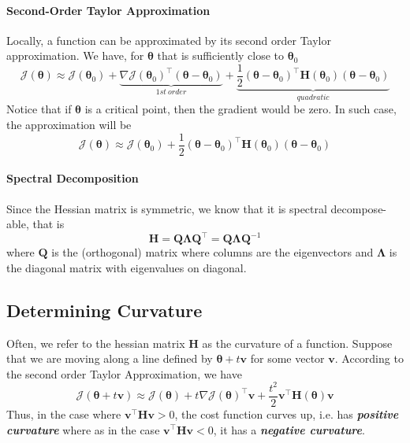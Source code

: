 \documentclass[11pt]{article}
\newcommand{\bv}{\mathbf{v}}
\begin{document}
\paragraph{Second-Order Taylor Approximation} Locally, a function can be approximated by its second order Taylor approximation. We have, for $\boldsymbol{\theta}$ that is sufficiently close to $\boldsymbol{\theta}_0$
\begin{equation}
    \mathcal{J}(\boldsymbol{\theta}) \approx \mathcal{J}\left(\boldsymbol{\theta}_{0}\right)+ 
    \underbrace{\nabla \mathcal{J}\left(\boldsymbol{\theta}_{0}\right)^{\top}\left(\boldsymbol{\theta}-\boldsymbol{\theta}_{0}\right)}_{1st~order}
     +\underbrace{\frac{1}{2}\left(\boldsymbol{\theta}-\boldsymbol{\theta}_{0}\right)^{\top} \mathbf{H}\left(\boldsymbol{\theta}_{0}\right)\left(\boldsymbol{\theta}-\boldsymbol{\theta}_{0}\right)}_{quadratic}
\end{equation}
Notice that if $\boldsymbol{\theta}$ is a critical point, then the gradient would be zero. In such case, the approximation will be
\begin{equation}
    \mathcal{J}(\boldsymbol{\theta}) \approx \mathcal{J}\left(\boldsymbol{\theta}_{0}\right)+\frac{1}{2}\left(\boldsymbol{\theta}-\boldsymbol{\theta}_{0}\right)^{\top} \mathbf{H}\left(\boldsymbol{\theta}_{0}\right)\left(\boldsymbol{\theta}-\boldsymbol{\theta}_{0}\right)
\end{equation}

\paragraph{Spectral Decomposition}
Since the Hessian matrix is symmetric, we know that it is spectral decompose-able, that is
\begin{equation}
    \mathbf{H}=\mathbf{Q} \mathbf{\Lambda} \mathbf{Q}^{\top} = \mathbf{Q} \mathbf{\Lambda} \mathbf{Q}^{-1}
\end{equation}
where $\mathbf{Q}$ is the (orthogonal) matrix where columns are the eigenvectors and $\boldsymbol{\Lambda}$ is the diagonal matrix with eigenvalues on diagonal. 


\subsection{Determining Curvature}
Often, we refer to the hessian matrix $\mathbf{H}$ as the curvature of a function. Suppose that we are moving along a line defined by $\boldsymbol{\theta} + t\bv$ for some vector $\bv$. According to the second order Taylor Approximation, we have
\begin{equation}
    \mathcal{J}(\boldsymbol{\theta}+t \mathbf{v}) \approx \mathcal{J}(\boldsymbol{\theta})+t \nabla \mathcal{J}(\boldsymbol{\theta})^{\top} \mathbf{v}+\frac{t^{2}}{2} \mathbf{v}^{\top} \mathbf{H}(\boldsymbol{\theta}) \mathbf{v}
\end{equation}
Thus, in the case where $\bv^\top\mathbf{H}\bv > 0$, the cost function curves up, i.e. has \textit{\textbf{positive curvature}} where as in the case $\bv^\top\mathbf{H}\bv < 0$, it has a \textit{\textbf{negative curvature}}.
\end{document}
